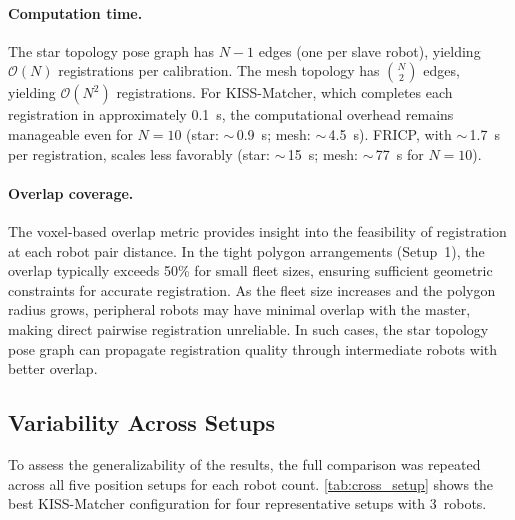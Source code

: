 
\paragraph{Computation time.}
The star topology pose graph has $N-1$ edges (one per slave robot),
yielding $\mathcal{O}(N)$ registrations per calibration.
The mesh topology has $\binom{N}{2}$ edges, yielding
$\mathcal{O}(N^2)$ registrations.
For KISS-Matcher, which completes each registration in approximately
\SI{0.1}{\second}, the computational overhead remains manageable even
for $N = 10$ (star: $\sim$\,\SI{0.9}{\second}; mesh:
$\sim$\,\SI{4.5}{\second}).
FRICP, with $\sim$\,\SI{1.7}{\second} per registration, scales
less favorably (star: $\sim$\,\SI{15}{\second}; mesh:
$\sim$\,\SI{77}{\second} for $N = 10$).

\paragraph{Overlap coverage.}
The voxel-based overlap metric provides insight into the feasibility
of registration at each robot pair distance.
In the tight polygon arrangements (Setup~1), the overlap typically
exceeds 50\% for small fleet sizes, ensuring sufficient geometric
constraints for accurate registration.
As the fleet size increases and the polygon radius grows, peripheral
robots may have minimal overlap with the master, making direct
pairwise registration unreliable.
In such cases, the star topology pose graph can propagate
registration quality through intermediate robots with better
overlap.

\subsection{Variability Across Setups}
\label{sec:variability}

To assess the generalizability of the results, the full comparison
was repeated across all five position setups for each robot count.
\autoref{tab:cross_setup} shows the best KISS-Matcher configuration
for four representative setups with 3~robots.

